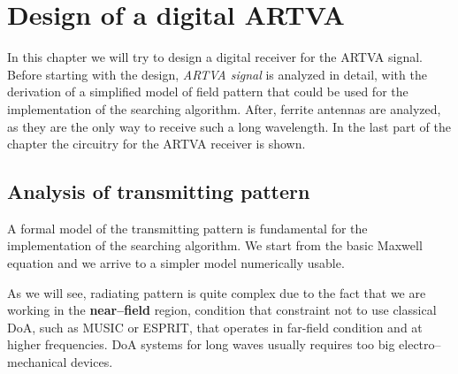 
\chapter{Design of a digital ARTVA \label{ch:chapter2}}
\minitoc
\renewcommand{\arraystretch}{2}

In this chapter we will try to design a digital receiver for the ARTVA signal. Before starting with the design, \emph{ARTVA signal} is analyzed in detail, with the derivation of a simplified model of field pattern that could be used  for the implementation of the searching algorithm. After, ferrite antennas are analyzed, as they are the only way to receive such a long wavelength. In the last part of the chapter the circuitry for the ARTVA receiver is shown.

\section{Analysis of transmitting pattern}

A formal model of the transmitting pattern is fundamental for the implementation of the searching algorithm. We start from the basic Maxwell equation and we arrive to a simpler model numerically usable.

As we will see, radiating pattern is quite complex due to the fact that we are working in the \textbf{near--field} region, condition that constraint not to use classical DoA, such as MUSIC or ESPRIT, that operates in far-field condition and at higher frequencies. DoA systems for long waves usually requires too big electro--mechanical devices.

